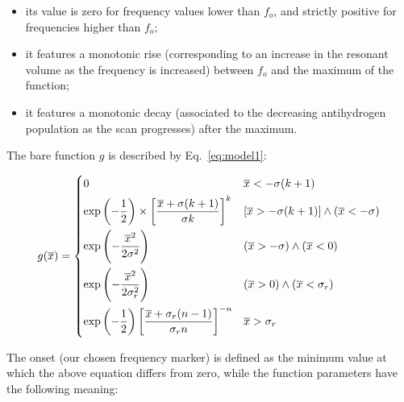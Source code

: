 \begin{itemize}
    \item its value is zero for frequency values lower than $f_o$, and strictly positive for frequencies higher than  $f_o$; 
    \item it features a monotonic rise (corresponding to an increase in the resonant volume as the frequency is increased) between $f_o$ and the maximum of the function;
    \item it features a monotonic decay (associated to the decreasing antihydrogen population as the scan progresses) after the maximum.
\end{itemize}

The bare function $g$ is described by Eq.~\ref{eq:model1}:

\begin{equation}
\centering
g(\overline{x})=
\begin{dcases}
 0        & \overline{x} < - \sigma (k + 1) \\
\exp\left(-\frac{1}{2}\right) \times \left[\frac{\overline{x} + \sigma (k + 1)}{\sigma k}\right]^k  & [\overline{x} > - \sigma (k + 1)] \land (\overline{x}<- \sigma) \\
\exp\left(-\frac{\overline{x}^2}{2\sigma^2}\right)  & (\overline{x} >-\sigma) \land (\overline{x}<0) \\
\exp\left(-\frac{\overline{x}^2}{2\sigma_r^2}\right) & (\overline{x} >0) \land (\overline{x}< \sigma_r) \\
\exp\left(-\frac{1}{2}\right)\left[\frac{\overline{x} + \sigma_r(n-1) } {\sigma_rn} \right]^{-n} & \overline{x} > \sigma_r \\
\end{dcases}
\label{eq:model1}
\end{equation}

The onset (our chosen frequency marker) is defined as the minimum value at which the above equation differs from zero, while the function parameters have the following meaning:

